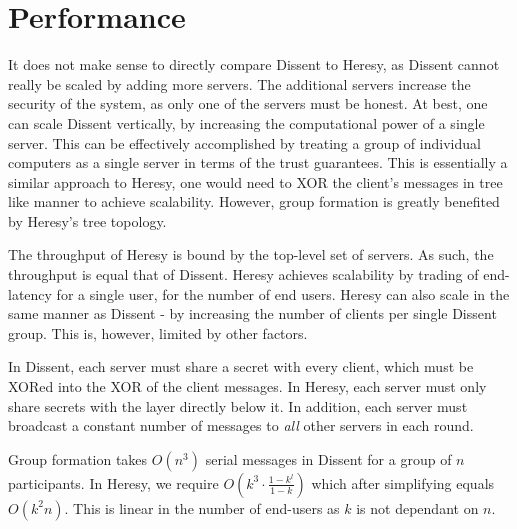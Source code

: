 \section{Performance}

It does not make sense to directly compare Dissent to Heresy, as Dissent cannot really be scaled by adding more servers. The additional servers increase the security of the system, as only one of the servers must be honest. At best, one can scale Dissent vertically, by increasing the computational power of a single server. This can be effectively accomplished by treating a group of individual computers as a single server in terms of the trust guarantees. This is essentially a similar approach to Heresy, one would need to XOR the client's messages in tree like manner to achieve scalability. However, group formation is greatly benefited  by Heresy's tree topology.

The throughput of Heresy is bound by the top-level set of servers. As such,
the throughput is equal that of Dissent. Heresy achieves scalability by trading of end-latency for a single user, for the number of end users. Heresy can also scale in the same manner as Dissent - by increasing the number of clients per single Dissent group. This is, however, limited by other factors.

In Dissent, each server must share a secret with every client, which must be XORed into the XOR of the client messages. In Heresy, each server must only share secrets with the layer directly below it. In addition, each server must broadcast a constant number of messages to \emph{all} other servers in each round. 
 
Group formation takes $O(n^3)$ serial messages in Dissent for a group of $n$ participants. In Heresy, we require $O(k^3 \cdot \frac{1-k^l}{1-k})$ which after simplifying equals $O(k^2n)$. This is linear in the number of end-users as $k$ is not dependant on $n$.



